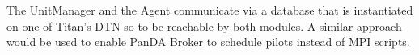 The UnitManager and the Agent communicate via a database that is instantiated on
one of Titan's DTN so to be reachable by both modules. A similar approach would
be used to enable PanDA Broker to schedule pilots instead of MPI
scripts.


%



